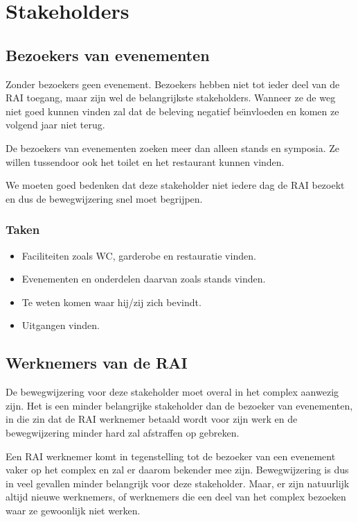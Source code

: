 \chapter{Stakeholders}


\section{Bezoekers van evenementen} \label{sectie:stkh_bzkr}

Zonder bezoekers geen evenement. Bezoekers hebben niet tot ieder deel van de RAI toegang, maar zijn wel de belangrijkste stakeholders. Wanneer ze de weg niet goed kunnen vinden zal dat de beleving negatief be\"\i nvloeden en komen ze volgend jaar niet terug.

De bezoekers van evenementen zoeken meer dan alleen stands en symposia. Ze willen tussendoor ook het toilet en het restaurant kunnen vinden.

We moeten goed bedenken dat deze stakeholder niet iedere dag de RAI bezoekt en dus de bewegwijzering snel moet begrijpen.

\subsection*{Taken}

\begin{itemize}
\item Faciliteiten zoals WC, garderobe en restauratie vinden.
\item Evenementen en onderdelen daarvan zoals stands vinden.
\item Te weten komen waar hij/zij zich bevindt.
\item Uitgangen vinden.
\end{itemize}


\section{Werknemers van de RAI}

De bewegwijzering voor deze stakeholder moet overal in het complex aanwezig zijn. Het is een minder belangrijke stakeholder dan de bezoeker van evenementen, in die zin dat de RAI werknemer betaald wordt voor zijn werk en de bewegwijzering minder hard zal afstraffen op gebreken.

Een RAI werknemer komt in tegenstelling tot de bezoeker van een evenement  vaker op het complex en zal er daarom bekender mee zijn. Bewegwijzering is dus in veel gevallen minder belangrijk voor deze stakeholder. Maar, er zijn natuurlijk altijd nieuwe werknemers, of werknemers die een deel van het complex bezoeken waar ze gewoonlijk niet werken.


